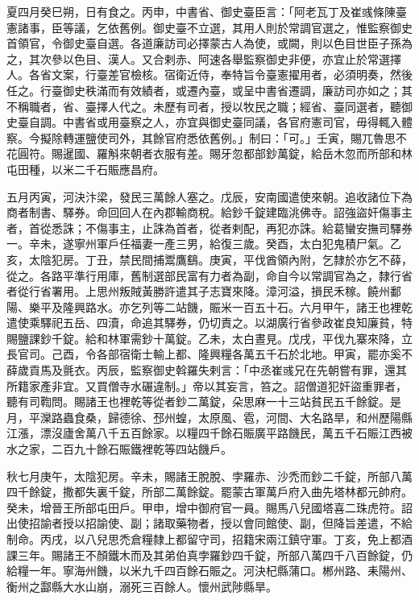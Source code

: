 \begin{pinyinscope}
 夏四月癸巳朔，日有食之。丙申，中書省、御史臺臣言：「阿老瓦丁及崔彧條陳臺憲諸事，臣等議，乞依舊例。御史臺不立選，其用人則於常調官選之，惟監察御史首領官，令御史臺自選。各道廉訪司必擇蒙古人為使，或闕，則以色目世臣子孫為之，其次參以色目、漢人。又合剌赤、阿速各舉監察御史非便，亦宜止於常選擇人。各省文案，行臺差官檢核。宿衛近侍，奉特旨令臺憲擢用者，必須明奏，然後任之。行臺御史秩滿而有效績者，或遷內臺，或呈中書省遷調，廉訪司亦如之；其不稱職者，省、臺擇人代之。未歷有司者，授以牧民之職；經省、臺同選者，聽御史臺自調。中書省或用臺察之人，亦宜與御史臺同議，各官府憲司官，毋得輒入體察。今擬除轉運鹽使司外，其餘官府悉依舊例。」制曰：「可。」壬寅，賜兀魯思不花圓符。賜暹國、羅斛來朝者衣服有差。賜牙忽都部鈔萬錠，給岳木忽而所部和林屯田種，以米二千石賑應昌府。



 五月丙寅，河決汴梁，發民三萬餘人塞之。戊辰，安南國遣使來朝。追收諸位下為商者制書、驛券。命回回人在內郡輸商稅。給鈔千錠建臨洮佛寺。詔強盜奸傷事主者，首從悉誅；不傷事主，止誅為首者，從者剌配，再犯亦誅。給葛蠻安撫司驛券一。辛未，遂寧州軍戶任福妻一產三男，給復三歲。癸酉，太白犯鬼積尸氣。乙亥，太陰犯房。丁丑，禁民間捕鬻鷹鷂。庚寅，平伐酋領內附，乞隸於亦乞不薛，從之。各路平準行用庫，舊制選部民富有力者為副，命自今以常調官為之，隸行省者從行省署用。上思州叛賊黃勝許遣其子志寶來降。漳河溢，損民禾稼。饒州鄱陽、樂平及隆興路水。亦乞列等二站饑，賑米一百五十石。六月甲午，諸王也裡乾遣使乘驛祀五岳、四瀆，命追其驛券，仍切責之。以湖廣行省參政崔良知廉貧，特賜鹽課鈔千錠。給和林軍需鈔十萬錠。乙未，太白晝見。戊戌，平伐九寨來降，立長官司。己酉，令各部宿衛士輸上都、隆興糧各萬五千石於北地。甲寅，罷亦奚不薛歲貢馬及氈衣。丙辰，監察御史斡羅失剌言：「中丞崔彧兄在先朝嘗有罪，還其所籍家產非宜。又買僧寺水碾違制。」帝以其妄言，笞之。詔僧道犯奸盜重罪者，聽有司鞫問。賜諸王也裡乾等從者鈔二萬錠，朵思麻一十三站貧民五千餘錠。是月，平灤路蟲食桑，歸德徐、邳州蝗，太原風、雹，河間、大名路旱，和州歷陽縣江漲，漂沒廬舍萬八千五百餘家。以糧四千餘石賑廣平路饑民，萬五千石賑江西被水之家，二百九十餘石賑鐵裡乾等四站饑戶。



 秋七月庚午，太陰犯房。辛未，賜諸王脫脫、孛羅赤、沙禿而鈔二千錠，所部八萬四千餘錠，撒都失裏千錠，所部二萬餘錠。罷蒙古軍萬戶府入曲先塔林都元帥府。癸未，增晉王所部屯田戶。甲申，增中御府官一員。賜馬八兒國塔喜二珠虎符。詔出使招諭者授以招諭使、副；諸取藥物者，授以會同館使、副，但降旨差遣，不給制命。丙戌，以八兒思禿倉糧隸上都留守司，招籍宋兩江鎮守軍。丁亥，免上都酒課三年。賜諸王不顏鐵木而及其弟伯真孛羅鈔四千錠，所部八萬四千八百餘錠，仍給糧一年。寧海州饑，以米九千四百餘石賑之。河決杞縣蒲口。郴州路、耒陽州、衡州之酃縣大水山崩，溺死三百餘人。懷州武陟縣旱。




\end{pinyinscope}
